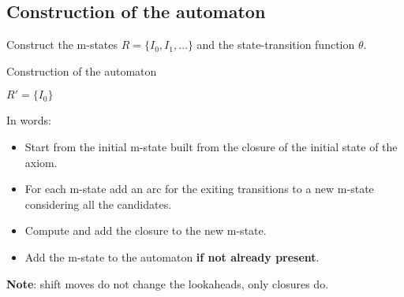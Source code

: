 \subsection{Construction of the automaton}
Construct the m-states $R = \{I_0, I_1, \ldots\}$ and the state-transition function $\theta$.

\begin{algorithm*}[H]
    \caption{Construction of the automaton}
    \SetAlgoLined
    $R' = \{I_0\}$\;
\end{algorithm*}

\newpage

In words:
\begin{itemize}
    \item Start from the initial m-state built from the closure of the initial state of the axiom.
    \item For each m-state add an arc for the exiting transitions to a new m-state considering all the candidates.
    \item Compute and add the closure to the new m-state.
    \item Add the m-state to the automaton \textbf{if not already present}.
\end{itemize}

\textbf{Note}: shift moves do not change the lookaheads, only closures do.
